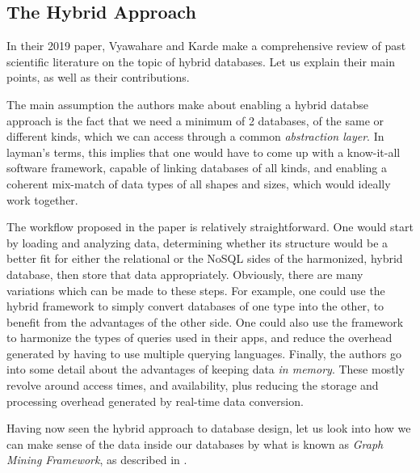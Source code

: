 \documentclass[10pt,        %
               a4paper,     %
               journal,     %
               ]{IEEEtran}
\begin{document}
\subsection{The Hybrid Approach}
In their 2019 paper, Vyawahare and Karde \cite{IEEEpaper3:hybrid} make a comprehensive review of past scientific literature on the topic of hybrid databases. Let us explain their main points, as well as their contributions. \par
The main assumption the authors make about enabling a hybrid databse approach is the fact that we need a minimum of 2 databases, of the same or different kinds, which we can access through a common \textit{abstraction layer}. In layman's terms, this implies that one would have to come up with a know-it-all software framework, capable of linking databases of all kinds, and enabling a coherent mix-match of data types of all shapes and sizes, which would ideally work together. \par
The workflow proposed in the paper is relatively straightforward. One would start by loading and analyzing data, determining whether its structure would be a better fit for either the relational or the NoSQL sides of the harmonized, hybrid database, then store that data appropriately. Obviously, there are many variations which can be made to these steps. For example, one could use the hybrid framework to simply convert databases of one type into the other, to benefit from the advantages of the other side. One could also use the framework to harmonize the types of queries used in their apps, and reduce the overhead generated by having to use multiple querying languages. Finally, the authors go into some detail about the advantages of keeping data \textit{in memory}. These mostly revolve around access times, and availability, plus reducing the storage and processing overhead generated by real-time data conversion. \par
Having now seen the hybrid approach to database design, let us look into how we can make sense of the data inside our databases by what is known as \textit{Graph Mining Framework}, as described in \cite{IEEEpaper2:mining}.
\end{document}
